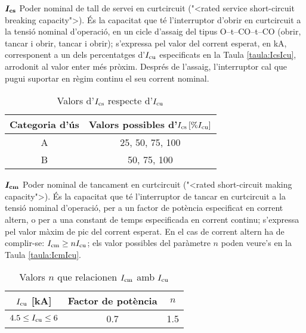 \begin{list}{}
    \item[$\boldsymbol{I_\mathrm{cs}}$] Poder nominal de tall de servei en curtcircuit ({"<}rated service  short-circuit breaking capacity{">}). \'{E}s la capacitat que t\'{e} l'interruptor d'obrir en curtcircuit a la tensi\'{o} nominal d'operaci\'{o}, en un cicle d'assaig del tipus O--t--CO--t--CO (obrir, tancar i obrir, tancar i obrir); s'expressa pel valor  del corrent esperat, en kA, corresponent a un dels percentatges d'$I_\mathrm{cu}$ especificats en la Taula \vref{taula:IcsIcu}, arrodonit al valor enter m\'{e}s pr\`{o}xim. Despr\'{e}s de l'assaig, l'interruptor cal que pugui suportar en r\`{e}gim continu  el seu corrent nominal.
         \begin{table}[h]
           \caption{\label{taula:IcsIcu} Valors d'$I_\mathrm{cs}$ respecte d'$I_\mathrm{cu}$}
           \begin{center}\begin{tabular}{cc}
           \toprule[1pt]
           Categoria d'\'{u}s &  Valors possibles d'$I_\mathrm{cs}\, [\% I_\mathrm{cu}]$ \\
           \midrule
           A &  25, 50, 75, 100   \\
           B & 50, 75, 100   \\
           \bottomrule[1pt]
           \end{tabular} \end{center}
         \end{table}
    \item[$\boldsymbol{I_\mathrm{cm}}$] Poder nominal de tancament en curtcircuit ({"<}rated short-circuit making capacity{">}). \'{E}s la capacitat que t\'{e} l'interruptor de tancar en curtcircuit a la tensi\'{o} nominal d'operaci\'{o}, per a un factor de pot\`{e}ncia especificat en corrent altern, o per a una constant de temps especificada en corrent continu; s'expressa pel valor m\`{a}xim de pic del corrent esperat. En el cas de corrent altern ha de complir-se: $I_\mathrm{cm} \geq n I_\mathrm{cu}$; els valor possibles del par\`{a}metre $n$ poden veure's en la Taula \vref{taula:IcmIcu}.
        \begin{table}[h]
           \caption{\label{taula:IcmIcu} Valors $n$ que relacionen $I_\mathrm{cm}$ amb $I_\mathrm{cu}$}
           \begin{center}\begin{tabular}{ccc}
           \toprule[1pt]
           $I_\mathrm{cu}$  [kA] &  Factor de pot\`{e}ncia & $n$ \\
           \midrule
           $\num{4,5} \leq I_\mathrm{cu} \leq 6$\phantom{0} & \num{0,7}\phantom{0}  & \num{1,5}   \\

\end{tabular}
\end{center}
\end{table}
\end{list}
